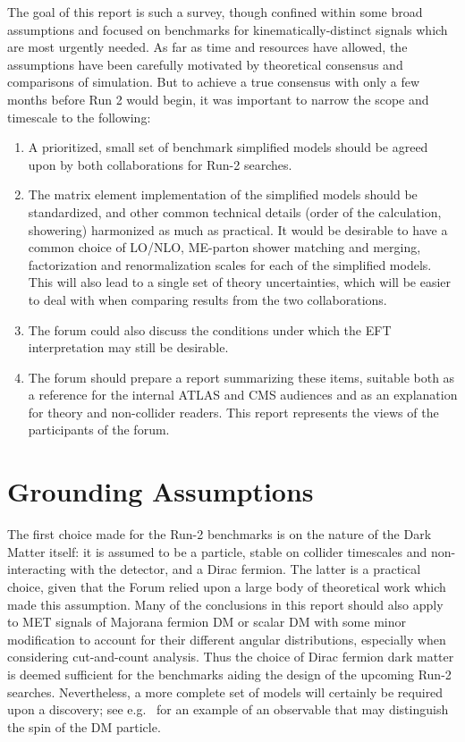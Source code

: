 The goal of this report is such a survey, though confined within some
broad assumptions and focused on benchmarks for kinematically-distinct
signals which are most urgently needed. As far as time and resources
have allowed, the assumptions have been carefully motivated by
theoretical consensus and comparisons of simulation. But to achieve a
true consensus with only a few months before Run 2 would begin, it was
important to narrow the scope and timescale to the following:

\begin{enumerate}
\item A prioritized, small set of benchmark simplified models should
  be agreed upon by both collaborations for Run-2 searches.
\item The matrix element implementation of the simplified models
  should be standardized, and other common technical details (order of
  the calculation, showering) harmonized as much as practical. It
  would be desirable to have a common choice of LO/NLO, ME-parton
  shower matching and merging, factorization and renormalization
  scales for each of the simplified models. This will also lead to a
  single set of theory uncertainties, which will be easier to deal
  with when comparing results from the two collaborations.
\item The forum could also discuss the conditions under which the EFT
  interpretation may still be desirable.
\item The forum should prepare a report summarizing these items,
  suitable both as a reference for the internal ATLAS and CMS
  audiences and as an explanation for theory and non-collider
  readers. This report represents the views of the participants of the
  forum.
\end{enumerate}

\section{Grounding Assumptions}

The first choice made for the Run-2 benchmarks is on the nature of the
Dark Matter itself: it is assumed to be a particle, stable on collider
timescales and non-interacting with the detector, and a Dirac fermion.
The latter is a practical choice, given that the Forum relied upon a
large body of theoretical work which made this assumption. Many of the
conclusions in this report should also apply to MET signals of
Majorana fermion DM or scalar DM with some minor modification to
account for their different angular distributions, especially when
considering cut-and-count analysis. Thus the choice of Dirac fermion
dark matter is deemed sufficient for the benchmarks aiding the design
of the upcoming Run-2 searches. Nevertheless, a more complete set of
models will certainly be required upon a discovery; see
e.g.~\cite{Crivellin:2015wva} for an example of an observable that may
distinguish the spin of the DM particle.

